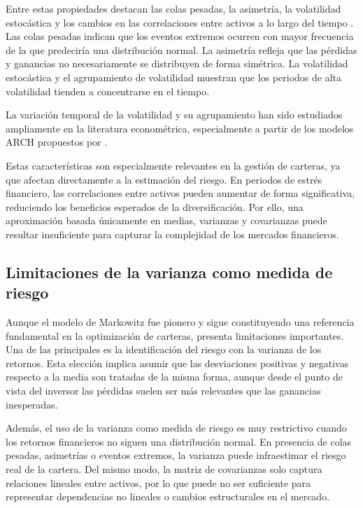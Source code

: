 Entre estas propiedades destacan las colas pesadas, la asimetría, la volatilidad estocástica y los cambios en las correlaciones entre activos a lo largo del tiempo \cite{takahashi2019modeling}. Las colas pesadas indican que los eventos extremos ocurren con mayor frecuencia de la que predeciría una distribución normal. La asimetría refleja que las pérdidas y ganancias no necesariamente se distribuyen de forma simétrica. La volatilidad estocástica y el agrupamiento de volatilidad muestran que los periodos de alta volatilidad tienden a concentrarse en el tiempo.

La variación temporal de la volatilidad y su agrupamiento han sido estudiados ampliamente en la literatura econométrica, especialmente a partir de los modelos ARCH propuestos por \cite{engle1982autoregressive}.

Estas características son especialmente relevantes en la gestión de carteras, ya que afectan directamente a la estimación del riesgo. En periodos de estrés financiero, las correlaciones entre activos pueden aumentar de forma significativa, reduciendo los beneficios esperados de la diversificación. Por ello, una aproximación basada únicamente en medias, varianzas y covarianzas puede resultar insuficiente para capturar la complejidad de los mercados financieros.

\subsection{Limitaciones de la varianza como medida de riesgo}

Aunque el modelo de Markowitz fue pionero y sigue constituyendo una referencia fundamental en la optimización de carteras, presenta limitaciones importantes. Una de las principales es la identificación del riesgo con la varianza de los retornos. Esta elección implica asumir que las desviaciones positivas y negativas respecto a la media son tratadas de la misma forma, aunque desde el punto de vista del inversor las pérdidas suelen ser más relevantes que las ganancias inesperadas.

Además, el uso de la varianza como medida de riesgo es muy restrictivo cuando los retornos financieros no siguen una distribución normal. En presencia de colas pesadas, asimetrías o eventos extremos, la varianza puede infraestimar el riesgo real de la cartera. Del mismo modo, la matriz de covarianzas solo captura relaciones lineales entre activos, por lo que puede no ser suficiente para representar dependencias no lineales o cambios estructurales en el mercado.

